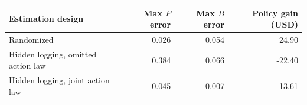 \begin{tabular}{@{}lrrr@{}}
\toprule
Estimation design & Max $P$ error & Max $B$ error & Policy gain (USD)\\
\midrule
Randomized & 0.026 & 0.054 & 24.90\\
Hidden logging, omitted action law & 0.384 & 0.066 & -22.40\\
Hidden logging, joint action law & 0.045 & 0.007 & 13.61\\
\bottomrule
\end{tabular}
